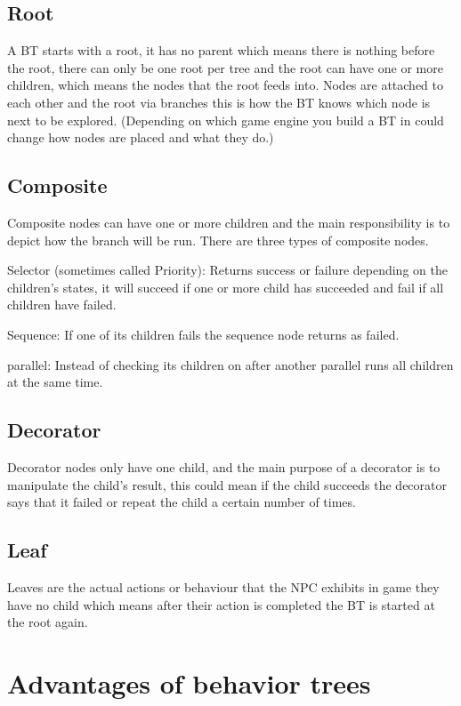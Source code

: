 \documentclass{scrartcl}
\begin{document}
\subsection{Root}

A BT starts with a root, it has no parent which means there is nothing before the root, there can only be one root per tree and the root can have one or more children, which means the nodes that the root feeds into. Nodes are attached to each other and the root via branches this is how the BT knows which node is next to be explored. (Depending on which game engine you build a BT in could change how nodes are placed and what they do.)

\subsection{Composite}

Composite nodes can have one or more children and the main responsibility is to depict how the branch will be run. There are three types of composite nodes. 

Selector (sometimes called Priority): Returns success or failure depending on the children's states, it will succeed if one or more child has succeeded and fail if all children have failed\cite{UE4}.

Sequence: If one of its children fails the sequence node returns as failed.

parallel: Instead of checking its children on after another parallel runs all children at the same time.

\subsection{Decorator}

Decorator nodes only have one child, and the main purpose of a decorator is to manipulate the child's result, this could mean if the child succeeds the decorator says that it failed or repeat the child a certain number of times.

\subsection{Leaf}

Leaves are the actual actions or behaviour that the NPC exhibits in game they have no child which means after their action is completed the BT is started at the root again\cite{marzinotto2014towards}.

\section{Advantages of behavior trees}
\end{document}
